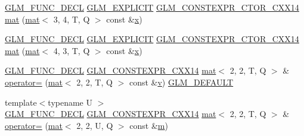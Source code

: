 \begin{DoxyCompactItemize}
\mbox{\hyperlink{setup_8hpp_ab2d052de21a70539923e9bcbf6e83a51}{G\+L\+M\+\_\+\+F\+U\+N\+C\+\_\+\+D\+E\+CL}} \mbox{\hyperlink{setup_8hpp_a6c74f5a5e7b134ab69023ff9a30d4d5d}{G\+L\+M\+\_\+\+E\+X\+P\+L\+I\+C\+IT}} \mbox{\hyperlink{setup_8hpp_a0900f9145e68bf6061b6f5e7be3fa751}{G\+L\+M\+\_\+\+C\+O\+N\+S\+T\+E\+X\+P\+R\+\_\+\+C\+T\+O\+R\+\_\+\+C\+X\+X14}} \mbox{\hyperlink{structglm_1_1mat_3_012_00_012_00_01_t_00_01_q_01_4_a79b318d4e27f7d75124cdb371a534970}{mat}} (\mbox{\hyperlink{structglm_1_1mat}{mat}}$<$ 3, 4, T, Q $>$ const \&\mbox{\hyperlink{_s_d_l__opengl_8h_ad0e63d0edcdbd3d79554076bf309fd47}{x}})
\item 
\mbox{\hyperlink{setup_8hpp_ab2d052de21a70539923e9bcbf6e83a51}{G\+L\+M\+\_\+\+F\+U\+N\+C\+\_\+\+D\+E\+CL}} \mbox{\hyperlink{setup_8hpp_a6c74f5a5e7b134ab69023ff9a30d4d5d}{G\+L\+M\+\_\+\+E\+X\+P\+L\+I\+C\+IT}} \mbox{\hyperlink{setup_8hpp_a0900f9145e68bf6061b6f5e7be3fa751}{G\+L\+M\+\_\+\+C\+O\+N\+S\+T\+E\+X\+P\+R\+\_\+\+C\+T\+O\+R\+\_\+\+C\+X\+X14}} \mbox{\hyperlink{structglm_1_1mat_3_012_00_012_00_01_t_00_01_q_01_4_aece09f8eb654228f28ed992288a3919a}{mat}} (\mbox{\hyperlink{structglm_1_1mat}{mat}}$<$ 4, 3, T, Q $>$ const \&\mbox{\hyperlink{_s_d_l__opengl_8h_ad0e63d0edcdbd3d79554076bf309fd47}{x}})
\item 
\mbox{\hyperlink{setup_8hpp_ab2d052de21a70539923e9bcbf6e83a51}{G\+L\+M\+\_\+\+F\+U\+N\+C\+\_\+\+D\+E\+CL}} \mbox{\hyperlink{setup_8hpp_a4dd12abf5e1164bc57f3a34671d03844}{G\+L\+M\+\_\+\+C\+O\+N\+S\+T\+E\+X\+P\+R\+\_\+\+C\+X\+X14}} \mbox{\hyperlink{structglm_1_1mat}{mat}}$<$ 2, 2, T, Q $>$ \& \mbox{\hyperlink{structglm_1_1mat_3_012_00_012_00_01_t_00_01_q_01_4_a8ee5f3e6cd86052e0ac2119f3ef52358}{operator=}} (\mbox{\hyperlink{structglm_1_1mat}{mat}}$<$ 2, 2, T, Q $>$ const \&\mbox{\hyperlink{_s_d_l__opengl_8h_a10a82eabcb59d2fcd74acee063775f90}{v}}) \mbox{\hyperlink{setup_8hpp_aefce7051c376a64ba89fa93a9f63bc2c}{G\+L\+M\+\_\+\+D\+E\+F\+A\+U\+LT}}
\item 
{\footnotesize template$<$typename U $>$ }\\\mbox{\hyperlink{setup_8hpp_ab2d052de21a70539923e9bcbf6e83a51}{G\+L\+M\+\_\+\+F\+U\+N\+C\+\_\+\+D\+E\+CL}} \mbox{\hyperlink{setup_8hpp_a4dd12abf5e1164bc57f3a34671d03844}{G\+L\+M\+\_\+\+C\+O\+N\+S\+T\+E\+X\+P\+R\+\_\+\+C\+X\+X14}} \mbox{\hyperlink{structglm_1_1mat}{mat}}$<$ 2, 2, T, Q $>$ \& \mbox{\hyperlink{structglm_1_1mat_3_012_00_012_00_01_t_00_01_q_01_4_a5b25b3f234873c4246a76fa03f7c83ef}{operator=}} (\mbox{\hyperlink{structglm_1_1mat}{mat}}$<$ 2, 2, U, Q $>$ const \&\mbox{\hyperlink{_s_d_l__opengl__glext_8h_af593500c283bf1a787a6f947f503a5c2}{m}})

\end{DoxyCompactItemize}
